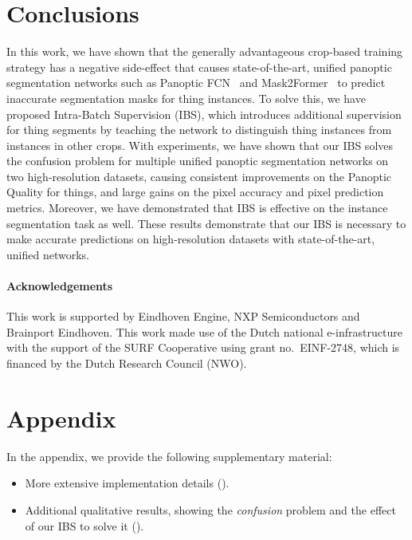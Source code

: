 \documentclass[10pt,twocolumn,letterpaper]{article}
\begin{document}
 \section{Conclusions}
\label{sec:conclusion}
In this work, we have shown that the generally advantageous crop-based training strategy has a negative side-effect that causes
state-of-the-art, unified panoptic segmentation networks such as Panoptic FCN~\cite{li2021panopticfcn} and Mask2Former~\cite{cheng2021mask2former} to predict inaccurate segmentation masks for thing instances. To solve this, we have proposed Intra-Batch Supervision (IBS), which introduces additional supervision for thing segments by teaching the network to distinguish thing instances from instances in other crops. With experiments, we have shown that our IBS solves the confusion problem for multiple unified panoptic segmentation networks on two high-resolution datasets, causing consistent improvements on the Panoptic Quality for things, and large gains on the pixel accuracy and pixel prediction metrics. Moreover, we have demonstrated that IBS is effective on the instance segmentation task as well. These results demonstrate that our IBS is necessary to make accurate predictions on high-resolution datasets with state-of-the-art, unified networks.








 
\vspace{-10pt}
\paragraph{Acknowledgements}
This work is supported by Eindhoven Engine, NXP Semiconductors and Brainport Eindhoven. This work made use of the Dutch national e-infrastructure with the support of the SURF Cooperative using grant no.~EINF-2748, which is financed by the Dutch Research Council (NWO).



{\small


}

\clearpage
\appendix 

\section*{Appendix}

\noindent In the appendix, we provide the following supplementary material:
\begin{itemize}
    \item More extensive implementation details ().
    \item Additional qualitative results, showing the \textit{confusion} problem and the effect of our IBS to solve it ().
\end{itemize}
\end{document}
